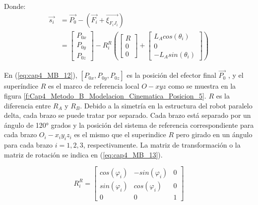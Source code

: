     Donde: 
    \begin{align}
        \overrightarrow{s_{i}} & = \overrightarrow{P_{0}}- \left(\overrightarrow{F_{i}}+\overrightarrow{\xi_{F_{i}J_{i}}} \right)\\&= 
            \begin{bmatrix}
                P_{0x} \\
                P_{0y} \\
                P_{0z}
            \end{bmatrix} -  R_{i}^{R}
            \left( 
            \begin{bmatrix}
                R \\
                0\\
                0
            \end{bmatrix} + 
            \begin{bmatrix}
                L_{A} cos(\theta_i) \\
                0\\
                -L_{A} sin(\theta_i) 
            \end{bmatrix}
            \right)
        \label{eq:cap4_MB_12}
    \end{align}


    En (\ref{eq:cap4_MB_12}), $[P_{0x},P_{0y},P_{0z}]$ es la posición del efector final $\overrightarrow{P_{0}}$ , y el superíndice $R$ es el marco de referencia local $O-xyz$ como se muestra en la figura \ref{f:Cap4_Metodo_B_Modelacion_Cinematica_Posicion_5}. $R$ es la diferencia entre ${R}_{A}$ y ${R}_{B}$.
    Debido a la simetría en la estructura del robot paralelo delta, cada brazo se puede tratar por separado. Cada brazo está separado por un ángulo de 120° grados y la posición del sistema de referencia correspondiente para cada brazo $O_i - x_i y_i z_i$  es el mismo que el superindice $R$ pero girado en un ángulo para cada brazo $i={1,2 ,3}$, respectivamente. 
    La matriz de transformación  o  la  matriz de rotación se indica en (\ref{eq:cap4_MB_13}).
    
       \begin{equation}
         R_{i}^{R} =
        \begin{bmatrix}
                cos(\varphi_i)&-sin(\varphi_i)&0 \\
                sin(\varphi_i)&cos(\varphi_i)&0 \\
                0&0&1
            \end{bmatrix}
        \label{eq:cap4_MB_13}
    \end{equation}  
    
